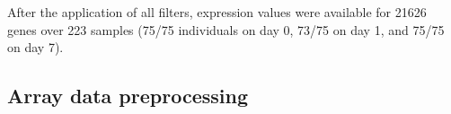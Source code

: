 After the application of all filters, expression values were available for 21626 genes over 223 samples (75/75 individuals on day 0, 73/75 on day 1, and 75/75 on day 7).

\subsection{Array data preprocessing}

